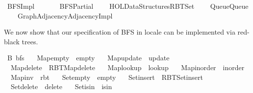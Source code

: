 %
\begin{isabellebody}%
%
%
\isadelimtheory
%
\endisadelimtheory
%
\isatagtheory
{}\isamarkupfalse%
\ BFS{\isacharunderscore}{\kern0pt}Impl\isanewline
\ \ \isanewline
\ \ \ \ BFS{\isacharunderscore}{\kern0pt}Partial\isanewline
\ \ \ \ {\isachardoublequoteopen}HOL{\isacharminus}{\kern0pt}Data{\isacharunderscore}{\kern0pt}Structures{\isachardot}{\kern0pt}RBT{\isacharunderscore}{\kern0pt}Set{}{\isachardoublequoteclose}\isanewline
\ \ \ \ {\isachardoublequoteopen}{\isachardot}{\kern0pt}{\isachardot}{\kern0pt}{\isacharslash}{\kern0pt}Queue{\isacharslash}{\kern0pt}Queue{\isachardoublequoteclose}\isanewline
\ \ \ \ {\isachardoublequoteopen}{\isachardot}{\kern0pt}{\isachardot}{\kern0pt}{\isacharslash}{\kern0pt}Graph{\isacharslash}{\kern0pt}Adjacency{\isacharslash}{\kern0pt}Adjacency{\isacharunderscore}{\kern0pt}Impl{\isachardoublequoteclose}\isanewline
{}%
\endisatagtheory
{\isafoldtheory}%
%
\isadelimtheory
%
\endisadelimtheory
%
\begin{isamarkuptext}%
We now show that our specification of BFS in locale  can be implemented via red-black
trees.%
\end{isamarkuptext}\isamarkuptrue%
\isamarkupfalse%
\ B{\isacharcolon}{\kern0pt}\ bfs\ \isanewline
\ \ Map{\isacharunderscore}{\kern0pt}empty\ {\isacharequal}{\kern0pt}\ empty\ \isanewline
\ \ Map{\isacharunderscore}{\kern0pt}update\ {\isacharequal}{\kern0pt}\ update\ \isanewline
\ \ Map{\isacharunderscore}{\kern0pt}delete\ {\isacharequal}{\kern0pt}\ RBT{\isacharunderscore}{\kern0pt}Map{\isachardot}{\kern0pt}delete\ \isanewline
\ \ Map{\isacharunderscore}{\kern0pt}lookup\ {\isacharequal}{\kern0pt}\ lookup\ \isanewline
\ \ Map{\isacharunderscore}{\kern0pt}inorder\ {\isacharequal}{\kern0pt}\ inorder\ \isanewline
\ \ Map{\isacharunderscore}{\kern0pt}inv\ {\isacharequal}{\kern0pt}\ rbt\ \isanewline
\ \ Set{\isacharunderscore}{\kern0pt}empty\ {\isacharequal}{\kern0pt}\ empty\ \isanewline
\ \ Set{\isacharunderscore}{\kern0pt}insert\ {\isacharequal}{\kern0pt}\ RBT{\isacharunderscore}{\kern0pt}Set{\isachardot}{\kern0pt}insert\ \isanewline
\ \ Set{\isacharunderscore}{\kern0pt}delete\ {\isacharequal}{\kern0pt}\ delete\ \isanewline
\ \ Set{\isacharunderscore}{\kern0pt}isin\ {\isacharequal}{\kern0pt}\ isin\ \isanewline

\end{isabellebody}
